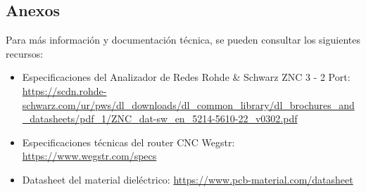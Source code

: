 \documentclass[a4paper, 12pt]{article}
\begin{document}
\subsection{Anexos}
Para más información y documentación técnica, se pueden consultar los siguientes recursos:

\begin{itemize}
    \item Especificaciones del Analizador de Redes Rohde \& Schwarz ZNC 3 - 2 Port: \url{https://scdn.rohde-schwarz.com/ur/pws/dl_downloads/dl_common_library/dl_brochures_and_datasheets/pdf_1/ZNC_dat-sw_en_5214-5610-22_v0302.pdf}
    \item Especificaciones técnicas del router CNC Wegstr: \url{https://www.wegstr.com/specs}
    \item Datasheet del material dieléctrico: \url{https://www.pcb-material.com/datasheet}
\end{itemize}
\end{document}
